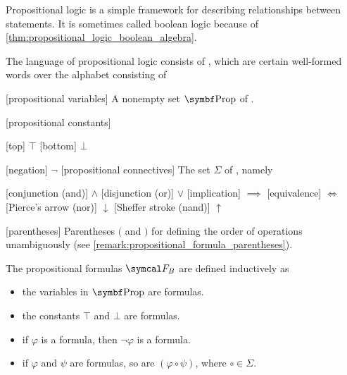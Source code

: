 \begin{definition}\label{def:propositional_logic_language}\cite[102]{OpenLogic20201202}
  Propositional logic is a simple framework for describing relationships between statements. It is sometimes called boolean logic because of \cref{thm:propositional_logic_boolean_algebra}.

  The language of propositional logic consists of , which are certain well-formed words over the alphabet consisting of
  \begin{description}
    [propositional variables] A nonempty set \( \Cat{Prop} \) of .

    [propositional constants]\mbox{}
    \begin{description}
      [top] \( \top \)
      [bottom] \( \bot \)
    \end{description}

    [negation] \( \neg \)
    [propositional connectives] The set \( \Sigma \) of , namely
    \begin{description}
      [conjunction (and)] \( \land \)
      [disjunction (or)] \( \lor \)
      [implication] \( \implies \)
      [equivalence] \( \iff \)
      [Pierce's arrow (nor)] \( \downarrow \)
      [Sheffer stroke (nand)] \( \uparrow \)
    \end{description}

    [parentheses] Parentheses \( ( \) and \( ) \) for defining the order of operations unambiguously (see \cref{remark:propositional_formula_parentheses}).
  \end{description}

  The propositional formulas \( \Cal{F}_B \) are defined inductively as
  \begin{itemize}
    \item the variables in \( \Cat{Prop} \) are formulas.
    \item the constants \( \top \) and \( \bot \) are formulas.
    \item if \( \varphi \) is a formula, then \( \neg \varphi \) is a formula.
    \item if \( \varphi \) and \( \psi \) are formulas, so are \( (\varphi \circ \psi) \), where \( \circ \in \Sigma \).
  \end{itemize}


\end{definition}
